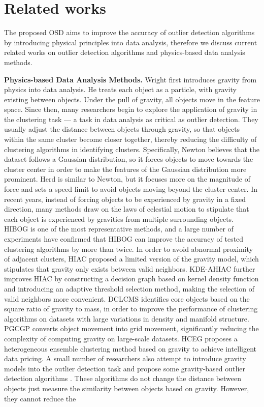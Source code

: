 \section{Related works}
\label{sec:Related works}
The proposed OSD aims to improve the accuracy of outlier detection algorithms by introducing physical principles into data analysis, therefore we discuss current related works on outlier detection algorithms and physics-based data analysis methods.

\textbf{Physics-based Data Analysis Methods.} Wright \cite{wright1977gravitational} first introduces gravity from physics into data analysis. He treats each object as a particle, with gravity existing between objects. Under the pull of gravity, all objects move in the feature space. Since then, many researchers begin to explore the application of gravity in the clustering task — a task in data analysis as critical as outlier detection. They usually adjust the distance between objects through gravity, so that objects within the same cluster become closer together, thereby reducing the difficulty of clustering algorithms in identifying clusters. Specifically, Newton \cite{blekas2007newtonian} believes that the dataset follows a Gaussian distribution, so it forces objects to move towards the cluster center in order to make the features of the Gaussian distribution more prominent. Herd \cite{wong2014herd} is similar to Newton, but it focuses more on the magnitude of force and sets a speed limit to avoid objects moving beyond the cluster center. In recent years, instead of forcing objects to be experienced by gravity in a fixed direction, many methods draw on the laws of celestial motion to stipulate that each object is experienced by gravities from multiple surrounding objects. HIBOG \cite{li2021hibog} is one of the most representative methods, and a large number of experiments have confirmed that HIBOG can improve the accuracy of tested clustering algorithms by more than twice. In order to avoid abnormal proximity of adjacent clusters, HIAC \cite{li2023improve} proposed a limited version of the gravity model, which stipulates that gravity only exists between valid neighbors. KDE-AHIAC \cite{pu2024adaptive} further improves HIAC by constructing a decision graph based on kernel density function and introducing an adaptive threshold selection method, making the selection of valid neighbors more convenient. DCLCMS \cite{zhang2022novel} identifies core objects based on the square ratio of gravity to mass, in order to improve the performance of clustering algorithms on datasets with large variations in density and manifold structure. PGCGP \cite{chen2023parallel} converts object movement into grid movement, significantly reducing the complexity of computing gravity on large-scale datasets. HCEG \cite{hao2024hceg} proposes a heterogeneous ensemble clustering method based on gravity to achieve intelligent data pricing. A small number of researchers also attempt to introduce gravity models into the outlier detection task and propose some gravity-based outlier detection algorithms \cite{zhu2022high, xie2020local}. These algorithms do not change the distance between objects just measure the similarity between objects based on gravity. However, they cannot reduce the 